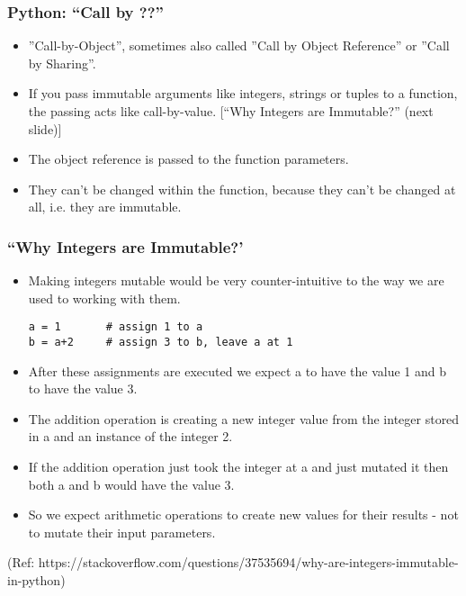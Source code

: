 \begin{frame}[fragile]\frametitle{Python: ``Call by ??'' }
    \begin{itemize}
    \item ''Call-by-Object'', sometimes also called ''Call by Object Reference'' or ''Call by Sharing''.
    \item If you pass immutable arguments like integers, strings or tuples to a function, the passing acts like call-by-value. [``Why Integers are Immutable?'' (next slide)]
    \item The object reference is passed to the function parameters. 
    \item They can't be changed within the function, because they can't be changed at all, i.e. they are immutable. 
            \end{itemize}
\end{frame}


\begin{frame}[fragile]\frametitle{``Why Integers are Immutable?' }
    \begin{itemize}
    \item Making integers mutable would be very counter-intuitive to the way we are used to working with them.
    \begin{lstlisting}
a = 1       # assign 1 to a
b = a+2     # assign 3 to b, leave a at 1
\end{lstlisting}
    \item After these assignments are executed we expect a to have the value 1 and b to have the value 3. 
    \item The addition operation is creating a new integer value from the integer stored in a and an instance of the integer 2. 
    \item If the addition operation just took the integer at a and just mutated it then both a and b would have the value 3. 
    \item So we expect arithmetic operations to create new values for their results - not to mutate their input parameters.
            \end{itemize}
            
            (Ref: https://stackoverflow.com/questions/37535694/why-are-integers-immutable-in-python)
\end{frame}


